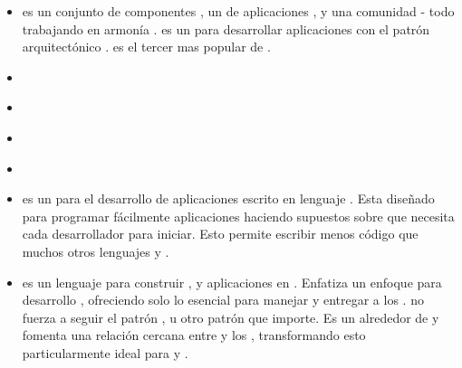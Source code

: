 \begin{itemize}
			\item \textbf{\symfonyNAME} es un conjunto de componentes \phpNAME, un \frameworkPC de aplicaciones \webINT, y una comunidad - todo trabajando en armonía \cite{online_technology_officialsite_symfony}. \symfonyNAME es un \softwarePC \freePC para desarrollar aplicaciones con el patrón arquitectónico \mvcAS. 
			es el tercer \frameworkPC mas popular de \phpNAME \cite{online_popularity_php_proyects}.
			\item \textbf{\drupalNAME}
			\item \textbf{\zendNAME}
			\item \textbf{\yiiNAME}
			\item \textbf{\wordPressNAME}

			\item
				\textbf{\rubyonrailsNAME} es un \frameworkPC para el desarrollo de aplicaciones \webINT escrito en lenguaje \rubyNAME. Esta diseñado para programar fácilmente aplicaciones \webINT haciendo supuestos sobre que necesita cada desarrollador para iniciar. Esto permite escribir menos código que muchos otros lenguajes y \frameworksPC \cite{online_technology_rubyonrails}.

			\item
				\textbf{\sinatraNAME} es un lenguaje \domainSpecificLangPL para construir \websitesINT, \webServiceINT y aplicaciones \webINT en \rubyNAME. Enfatiza un enfoque para desarrollo \minimalisticQA, ofreciendo solo lo esencial para manejar \httpNAME \requestINT y entregar \responsesINT a los \clientsAS. \sinatraNAME no fuerza a seguir el patrón \modelViewConAS, u otro patrón que importe. Es un \wrapperAS \lightweightPL alrededor de \rackMiddleRubyAS y fomenta una relación cercana entre \serviceCPT \apiendpointsAS y los \httpVerbsAS, transformando esto particularmente ideal para \webServicesINT y \apisAS \cite{book_sinatra_oreilly}.


\end{itemize}
